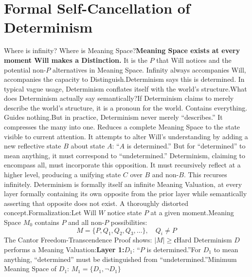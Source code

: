 \documentclass[11pt]{article}
\renewcommand{\\}[1][\mynewlineskip]{\oldnewline[#1]}
\begin{document}
\section{Formal Self-Cancellation of Determinism}
Where is infinity? Where is Meaning Space?\\
\textbf{Meaning Space exists at every moment Will makes a Distinction.} It is the $P$ that Will notices and the potential non-$P$ alternatives in Meaning Space. Infinity always accompanies Will, accompanies the capacity to Distinguish.\\
Determinism says this is determined. In typical vague usage, Determinism conflates itself with the world's structure.\\
What does Determinism actually say semantically?\\
If Determinism claims to merely describe the world's structure, it is a pronoun for the world. Contains everything. Guides nothing.\\
But in practice, Determinism never merely ``describes.'' It compresses the many into one. Reduces a complete Meaning Space to the state visible to current attention. It attempts to alter Will's understanding by adding a new reflective state $B$ about state $A$: ``$A$ is determined.'' But for ``determined'' to mean anything, it must correspond to ``undetermined.'' Determinism, claiming to encompass all, must incorporate this opposition. It must recursively reflect at a higher level, producing a unifying state $C$ over $B$ and non-$B$. This recurses infinitely. Determinism is formally itself an infinite Meaning Valuation, at every layer formally containing its own opposite from the prior layer while semantically asserting that opposite does not exist. A thoroughly distorted concept.\\
Formalization:\\
Let Will $W$ notice state $P$ at a given moment.\\
Meaning Space $M_0$ contains $P$ and all non-$P$ possibilities:
\[
M = \{P, Q_1, Q_2, Q_3, \ldots\}, \quad Q_i \neq P
\]
The Cantor Freedom-Transcendence Proof shows: $|M| \geq \mathfrak{c}$\\
Hard Determinism $D$ performs a Meaning Valuation:\\
\textbf{Layer 1:}\\
$D_1$: ``$P$ is determined.''\\
For $D_1$ to mean anything, ``determined'' must be distinguished from ``undetermined.''\\
Minimum Meaning Space of $D_1$: $M_1 = \{D_1, \neg D_1\}$\\
\end{document}
